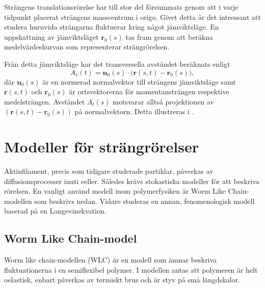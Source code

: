 Strängens translationsrörelse har till stor del försummats genom att i varje tidpunkt placerat strängens masscentrum i origo. Givet detta är det intressant att studera huruvida strängarna fluktuerar kring något jämviktsläge. En uppskattning av jämviktsläget $\mathbf{r}_0(s)$ tas fram genom att beräkna medelvärdeskurvan som representerar strängrörelsen. 

Från detta jämviktsläge har det transversella avståndet beräknats enligt 
\begin{equation}
A_s(t) = \mathbf{n}_0(s)\cdot\Big(\mathbf{r}(s,t)-\mathbf{r}_0(s)\Big),
\end{equation}
där $\mathbf{n}_0(s)$ är en normerad normalvektor till strängens jämviktsläge samt $\mathbf{r}(s,t)$ och $\mathbf{r}_0(s)$ är ortsvektorerna för momentansträngen respektive medelsträngen. Avståndet $A_t(s)$ motsvarar alltså projektionen av $(\mathbf{r}(s,t)-\mathbf{r}_0(s))$ på normalvektorn. Detta 
illustreras i .








\section{Modeller för strängrörelser}

Aktinfilament, precis som tidigare studerade partiklar, påverkas av diffusionsprocesser inuti celler. Således krävs stokastiska modeller för att beskriva rörelsen. En vanligt använd modell inom polymerfysiken är Worm Like Chain-modellen som beskrivs nedan. Vidare studeras en annan, fenomenologisk modell baserad på en Langevinekvation. 



\subsection{Worm Like Chain-model}\label{WLCmodel}

Worm like chain-modellen \cite{Milstein2013} (WLC) är en modell som ämnar beskriva fluktuationerna i en semiflexibel polymer. I modellen antas att polymeren är helt oelastisk, enbart påverkas av termiskt brus och är styv på små längdskalor. 

